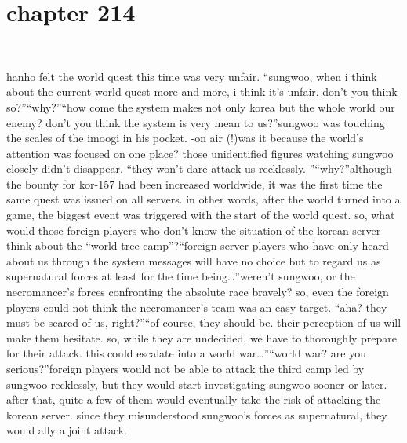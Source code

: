 \section{chapter 214}

                             




hanho felt the world quest this time was very unfair.
“sungwoo, when i think about the current world quest more and more, i think it’s unfair.
 don’t you think so?”“why?”“how come the system makes not only korea but the whole world our enemy? don’t you think the system is very mean to us?”sungwoo was touching the scales of the imoogi in his pocket.
-on air (!)was it because the world’s attention was focused on one place? those unidentified figures watching sungwoo closely didn’t disappear.
“they won’t dare attack us recklessly.
”“why?”although the bounty for kor-157 had been increased worldwide, it was the first time the same quest was issued on all servers.
in other words, after the world turned into a game, the biggest event was triggered with the start of the world quest.
 so, what would those foreign players who don’t know the situation of the korean server think about the “world tree camp”?“foreign server players who have only heard about us through the system messages will have no choice but to regard us as supernatural forces at least for the time being…”weren’t sungwoo, or the necromancer’s forces confronting the absolute race bravely? so, even the foreign players could not think the necromancer’s team was an easy target.
“aha? they must be scared of us, right?”“of course, they should be.
 their perception of us will make them hesitate.
 so, while they are undecided, we have to thoroughly prepare for their attack.
 this could escalate into a world war…”“world war? are you serious?”foreign players would not be able to attack the third camp led by sungwoo recklessly, but they would start investigating sungwoo sooner or later.
 after that, quite a few of them would eventually take the risk of attacking the korean server.
since they misunderstood sungwoo’s forces as supernatural, they would ally a joint attack.

